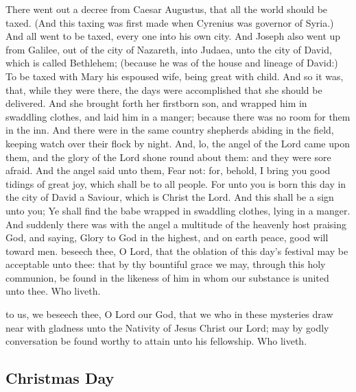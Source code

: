 \clearpage
{}
 There went out a decree from Caesar Augustus, that all the world should be taxed. (And this taxing was first made when Cyrenius was governor of Syria.) And all went to be taxed, every one into his own city. And Joseph also went up from Galilee, out of the city of Nazareth, into Judaea, unto the city of David, which is called Bethlehem; (because he was of the house and lineage of David:) To be taxed with Mary his espoused wife, being great with child. And so it was, that, while they were there, the days were accomplished that she should be delivered. And she brought forth her firstborn son, and wrapped him in swaddling clothes, and laid him in a manger; because there was no room for them in the inn. And there were in the same country shepherds abiding in the field, keeping watch over their flock by night. And, lo, the angel of the Lord came upon them, and the glory of the Lord shone round about them: and they were sore afraid. And the angel said unto them, Fear not: for, behold, I bring you good tidings of great joy, which shall be to all people. For unto you is born this day in the city of David a Saviour, which is Christ the Lord. And this shall be a sign unto you; Ye shall find the babe wrapped in swaddling clothes, lying in a manger. And suddenly there was with the angel a multitude of the heavenly host praising God, and saying, Glory to God in the highest, and on earth peace, good will toward men.
\secret
{} beseech thee, O Lord, that the oblation of this day's festival may be acceptable unto thee: that by thy bountiful grace we may, through this holy communion, be found in the likeness of him in whom our substance is united unto thee. Who liveth.

\postcommunion
{} to us, we beseech thee, O Lord our God, that we who in these mysteries draw near with gladness unto the Nativity of Jesus Christ our Lord; may by godly conversation be found worthy to attain unto his fellowship. Who liveth.


\clearpage
\subsection{Christmas Day}

